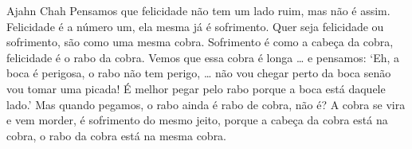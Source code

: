 
\begin{quotepage}{0.63\linewidth}{Ajahn Chah}
Pensamos que felicidade não tem um lado ruim, mas não é assim.
Felicidade é a número um, ela mesma já é sofrimento. Quer seja
felicidade ou sofrimento, são como uma mesma cobra. Sofrimento é como a
cabeça da cobra, felicidade é o rabo da cobra. Vemos que essa cobra é
longa \ldots{} e pensamos: ‘Eh, a boca é perigosa, o rabo não tem perigo,
\ldots{} não vou chegar perto da boca senão vou tomar uma picada! É melhor
pegar pelo rabo porque a boca está daquele lado.’ Mas quando pegamos, o
rabo ainda é rabo de cobra, não é? A cobra se vira e vem morder, é
sofrimento do mesmo jeito, porque a cabeça da cobra está na cobra, o
rabo da cobra está na mesma cobra.
\end{quotepage}

